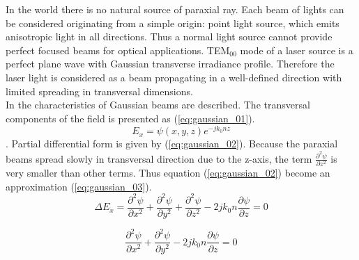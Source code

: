 In the world there is no natural source of paraxial ray. Each beam of lights can be considered originating from a simple origin: point light source, which emits anisotropic light in all directions. Thus a normal light source cannot provide perfect focused beams for optical applications. 
TEM$_{00}$ mode of a laser source is a perfect plane wave with Gaussian transverse irradiance profile\cite{CVI_Melles_Griot_Technical_Guide}. Therefore the laser light is considered as a beam propagating in a well-defined direction with limited spreading in transversal dimensions.\\ 
In \cite{ script_FT_TET} the characteristics of Gaussian beams are described. The transversal components of the field is presented as (\ref{eq:gaussian_01}). 
\begin{equation}
E_{x}=\psi(x,y,z)e^{-jk_{0}nz}
\label{eq:gaussian_01}
\end{equation}.
Partial differential form is given by (\ref{eq:gaussian_02}). Because the paraxial beams spread slowly in transversal direction due to the z-axis, the term $\frac{\partial ^{2}\psi}{\partial z^2}$ is very smaller than other terms. Thus equation (\ref{eq:gaussian_02}) become an approximation (\ref{eq:gaussian_03}).
\begin{equation}
\Delta E_{x}=\frac{\partial ^{2}\psi}{\partial x^2}+\frac{\partial ^{2}\psi}{\partial y^2}+\frac{ \partial ^{2}\psi}{\partial z^2}-2jk_{0}n\frac{\partial\psi}{\partial z}=0
\label{eq:gaussian_02}
\end{equation}

\begin{equation}
\frac{ \partial ^{2}\psi}{\partial x^2}+\frac{\partial ^{2}\psi}{\partial y^2}-2jk_{0}n\frac{\partial\psi}{\partial z}=0
\label{eq:gaussian_03}
\end{equation}

